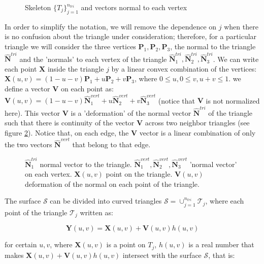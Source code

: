 \documentclass[11pt, oneside]{article}
\newcommand\bP{\boldsymbol P}
\newcommand\bN{\boldsymbol N}
\newcommand\bX{\boldsymbol X}
\newcommand\bY{\boldsymbol Y}
\newcommand\bV{\boldsymbol V}
\begin{document}
\begin{figure}[H]
\begin{center}
\end{center}
\caption{Skeleton $\{\mathit{T}_j\}_{j=1}^{n_{tri}}$ and vectors normal to each vertex}
\label{normalvert3}
\end{figure}

In order to simplify the notation, we will remove the dependence on $j$ when there is no confusion about the triangle under consideration; therefore, for a particular triangle  we will consider the three vertices $\bP_1,\bP_2,\bP_3$, the normal to the triangle $\hat{\bN}^{tri}$ and the 'normals' to each vertex of the triangle $\hat{\bN}_1^{tri},\hat{\bN}_2^{tri},\hat{\bN}_3^{tri}$. We can write each point $\bX$ inside the triangle $j$ by a linear convex combination of the vertices: $\bX(u,v)=(1-u-v)\bP_1+u\bP_2+v\bP_3$, where $0\le u, 0\le v, u+v\le1$. we define a vector $\bV$ on each point as: $\bV(u,v)=(1-u-v)\hat{\bN}_1^{vert}+u\hat{\bN}_2^{vert}+v\hat{\bN}_3^{vert}$ (notice that $\bV$ is not normalized here). This vector $\bV$ is a 'deformation' of the normal vector $\hat{\bN}^{tri}$ of the triangle such that there is continuity of the vector $\bV$ across two neighbor triangles (see figure \ref{normalvert3}). Notice that, on each edge, the $\bV$ vector is a linear combination of only the two vectors $\hat{\bN}^{vert}$  that belong to that edge.

\begin{figure}[H]
\begin{center}
\end{center}
\caption{$\hat{\bN}_1^{tri}$ normal vector to the triangle. $\hat{\bN}_1^{vert},\hat{\bN}_2^{vert},\hat{\bN}_3^{vert}$ 'normal vector' on each vertex. $\bX(u,v)$ point on the triangle. $\bV(u,v)$ deformation of the normal on each point of the triangle.}
\label{normalvert3}
\end{figure}


The surface $\mathcal{S}$ can be divided into curved triangles $\mathcal{S}=\cup_{j=1}^{n_{tri}}\mathcal{T}_j$, where each point of the triangle $\mathcal{T}_j$ written as:

\begin{equation}\label{chart0}
\bY(u,v)=\bX(u,v)+\bV(u,v)h(u,v)
\end{equation}

for certain $u,v$, where $\bX(u,v)$ is a point on $\mathit{T}_j$, $h(u,v)$ is a real number that makes $\bX(u,v)+\bV(u,v)h(u,v)$ intersect with the surface $\mathcal{S}$, that is:
\end{document}
